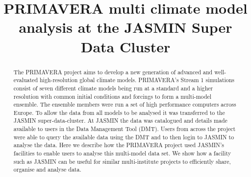 \documentclass[gmd, manuscript]{copernicus}
\begin{document}
\title{PRIMAVERA multi climate model analysis at the JASMIN Super Data Cluster}













\received{}
\pubdiscuss{} %
\revised{}
\accepted{}
\published{}




\maketitle



\begin{abstract}
The PRIMAVERA project aims to develop a new generation of advanced and well-evaluated high-resolution global climate models. PRIMAVERA's Stream 1 simulations consist of seven different climate models being run at a standard and a higher resolution with common initial conditions and forcings to form a multi-model ensemble. The ensemble members were run a set of high performance computers across Europe. To allow the data from all models to be analysed it was transferred to the JASMIN super-data-cluster. At JASMIN the data was catalogued and details made available to users in the Data Management Tool (DMT). Users from across the project were able to query the available data using the DMT and to then login to JASMIN to analyse the data. Here we describe how the PRIMAVERA project used JASMIN's facilities to enable users to analyse this multi-model data set. We show how a facility such as JASMIN can be useful for similar multi-institute projects to efficiently share, organise and analyse data.
\end{abstract}
\end{document}
